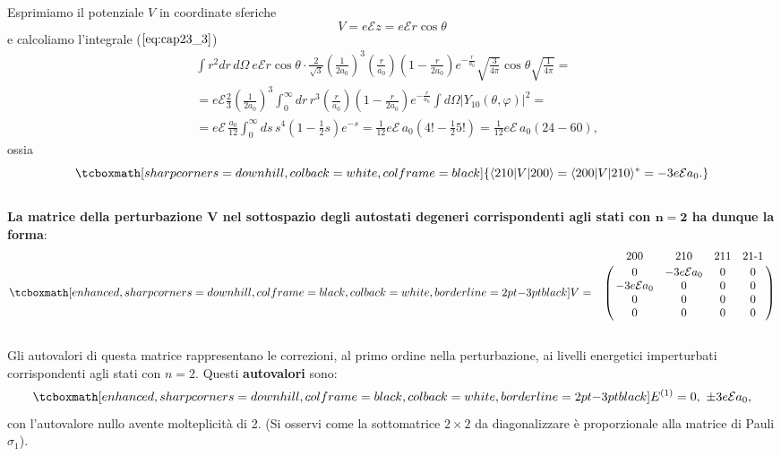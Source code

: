 Esprimiamo il potenziale $V$ in coordinate sferiche 
\begin{equation}
V=e \mathcal{E}z=e \mathcal{E} r \cos\theta
\end{equation}
e calcoliamo l'integrale ($\ref{eq:cap23_3}$) 
	\begin{align}
		 &  \int r^2 dr\, d\Omega \   e \mathcal{E} r \cos\theta \cdot    \frac{2}{\sqrt{3}} \left( \frac{1}{2a_0} \right)^{3}   \left( \frac{r}{a_0} \right)     \left( 1-\frac{r}{2a_0} \right)  e^{-\frac{r}{a_0}}\sqrt{\frac{3}{4 \pi}} \cos \theta \sqrt{\frac{1}{4 \pi}}=  \nonumber \\ 
		 & =  e \mathcal{E}  \frac{2}{3}  \left( \frac{1}{2a_0} \right)^{3} \int_0^{\infty} dr \, r^3 \left( \frac{r}{a_0} \right)     \left( 1-\frac{r}{2a_0} \right)  e^{-\frac{r}{a_0}}  \int d\Omega \left| Y_{10}(\theta, \varphi) \right|^2=  \nonumber \\
		 & =  e \mathcal{E} \, \frac{a_0}{12} \int_0^{\infty} ds \, s^4 \left(1-\frac{1}{2}s \right) e^{-s} = \frac{1}{12} e \mathcal{E} \, a_0 \left( 4!-\frac{1}{2}5! \right)= \frac{1}{12}  e \mathcal{E} \, a_0 (24-60),
	\end{align}
ossia 
	\begin{equation} 
		\tcboxmath[sharp corners=downhill, colback=white, colframe=black]{
			\langle 210|V|200\rangle= \langle 200 |V |210 \rangle^*=-3e\mathcal{E}a_0. 
			}
	\end{equation}\\
	
\textbf{La matrice della perturbazione $\boldsymbol{V}$ nel sottospazio degli autostati degeneri corrispondenti agli stati con $\boldsymbol{n=2}$ ha dunque la forma}:
	\begin{equation}  
		\tcboxmath[enhanced, sharp corners=downhill, colframe=black, colback=white, borderline={2pt}{-3pt}{black}]{
			V=
			\bordermatrix{~&200&210&211&21\textrm{-}1\cr
			& 0 & -3e\mathcal{E}a_0 & 0 & 0 \cr
			& -3e\mathcal{E}a_0 & 0 & 0 & 0 \cr
			& 0 & 0 & 0 & 0 \cr
			& 0 & 0 & 0 & 0 \cr}
			}
	\end{equation}\\
	
Gli autovalori di questa matrice rappresentano le correzioni, al primo ordine nella perturbazione, ai livelli energetici imperturbati corrispondenti agli stati con $n=2$. Questi \textbf{autovalori} sono:
	\begin{equation} 
		\tcboxmath[enhanced, sharp corners=downhill, colframe=black, colback=white, borderline={2pt}{-3pt}{black}]{
			E^{(1)}=0, \ \pm 3e\mathcal{E}a_0,
			}
	\end{equation}
con l'autovalore nullo avente molteplicità di 2. (Si osservi come la sottomatrice $2\times2$ da diagonalizzare è proporzionale alla matrice di Pauli $\sigma_1$).\\

